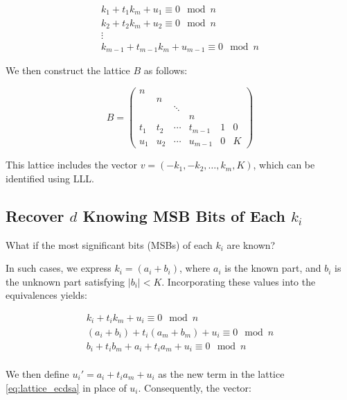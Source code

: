 \documentclass[a4paper,12pt]{report}
\begin{document}
\[
\begin{array}{c}
    k_1 + t_1k_m + u_1 \equiv 0 \mod n \\
    k_2 + t_2k_m + u_2 \equiv 0 \mod n \\
    \vdots \\
    k_{m-1} + t_{m-1}k_m + u_{m-1} \equiv 0 \mod n
\end{array}
\]

\vspace*{10px}

We then construct the lattice $B$ as follows:

\[
    B = 
    \begin{pmatrix}
     n &  \\
     & n \\
     & & \ddots \\
     & & & n \\
     t_1 & t_2 & \cdots & t_{m-1} & 1 & 0 \\
     u_1 & u_2 & \cdots & u_{m-1} & 0 & K
     \label{eq:lattice_ecdsa}
    \end{pmatrix}
\]

\vspace*{10px}

This lattice includes the vector $v = (-k_1, -k_2, \ldots, k_m, K)$, which can be identified using LLL.

\subsection{Recover $d$ Knowing MSB Bits of Each $k_i$}

What if the most significant bits (MSBs) of each $k_i$ are known?

In such cases, we express $k_i = (a_i + b_i)$, where $a_i$ is the known part, and $b_i$ is the unknown part satisfying $|b_i| < K$. Incorporating these values into the equivalences yields:

\[
    \begin{array}{c}
        k_i + t_ik_m + u_i \equiv 0 \mod n \\
        (a_i + b_i) + t_i(a_m + b_m) + u_i \equiv 0 \mod n \\
        b_i + t_ib_m + a_i + t_ia_m + u_i \equiv 0 \mod n \\
    \end{array}
\]

We then define $u_i' = a_i + t_ia_m + u_i$ as the new term in the lattice \ref{eq:lattice_ecdsa} in place of $u_i$. Consequently, the vector:
\end{document}
